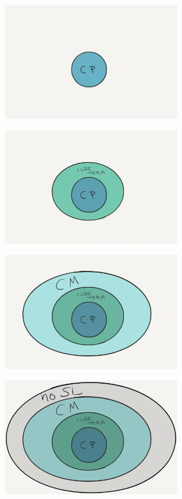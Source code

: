 \documentclass[xcolor=dvipsnames,9pt,handout,hide notes,mathserif]{beamer}
\begin{document}
{  \begin{overprint}
    \begin{center}\includegraphics[height=2in]{figures/CP-cropped.png}\end{center}
    \begin{center}\includegraphics[height=2in]{figures/Cube-cropped.png}\end{center}
    \begin{center}\includegraphics[height=2in]{figures/CM-cropped.png}\end{center}
    \begin{center}\includegraphics[height=2in]{figures/NoSL-cropped.png}\end{center}
  \end{overprint}
}
\end{document}
